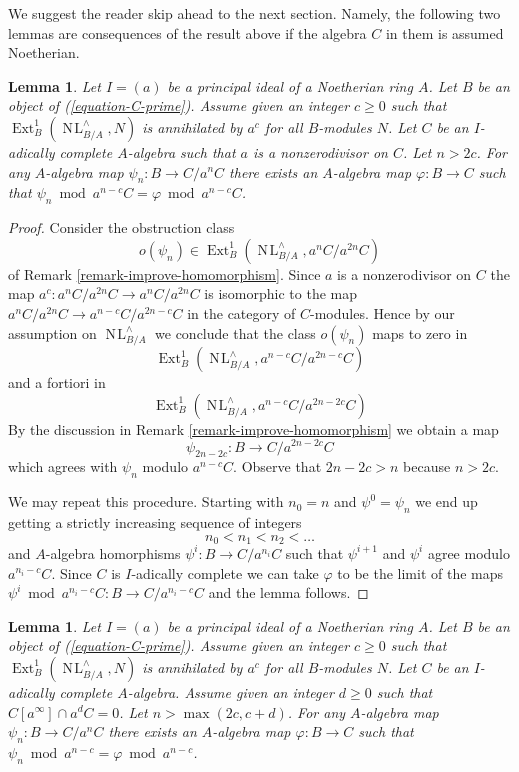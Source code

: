 \documentclass{stacks-project}
\theoremstyle{plain}
\newtheorem{lemma}[subsection]{Lemma}
\theoremstyle{definition}
\theoremstyle{remark}
\numberwithin{equation}{subsection}
\def\Ext{\mathop{\mathrm{Ext}}\nolimits}
\def\NL{\mathop{N\!L}\nolimits}
\begin{document}
\noindent
We suggest the reader skip ahead to the next section. Namely, the following
two lemmas are consequences of the result above if the algebra $C$ in them
is assumed Noetherian.

\begin{lemma}
\label{lemma-get-morphism-nonzerodivisor}
Let $I = (a)$ be a principal ideal of a Noetherian ring $A$.
Let $B$ be an object of (\ref{equation-C-prime}).
Assume given an integer $c \geq 0$ such that $\Ext^1_B(\NL_{B/A}^\wedge, N)$
is annihilated by $a^c$ for all $B$-modules $N$.
Let $C$ be an $I$-adically complete $A$-algebra such that
$a$ is a nonzerodivisor on $C$. Let $n > 2c$. For any $A$-algebra
map $\psi_n : B \to C/a^nC$ there exists an $A$-algebra
map $\varphi : B \to C$ such that
$\psi_n \bmod a^{n - c}C = \varphi \bmod a^{n - c}C$.
\end{lemma}

\begin{proof}
Consider the obstruction class
$$
o(\psi_n) \in \Ext^1_B(\NL_{B/A}^\wedge, a^nC/a^{2n}C)
$$
of Remark \ref{remark-improve-homomorphism}. Since $a$ is a nonzerodivisor
on $C$ the map $a^c : a^nC/a^{2n}C \to a^nC/a^{2n}C$ is isomorphic to the
map $a^nC/a^{2n}C \to a^{n - c}C/a^{2n - c}C$ in the category of $C$-modules.
Hence by our assumption on $\NL_{B/A}^\wedge$
we conclude that the class $o(\psi_n)$ maps to zero in
$$
\Ext^1_B(\NL_{B/A}^\wedge, a^{n - c}C/a^{2n - c}C)
$$
and a fortiori in
$$
\Ext^1_B(\NL_{B/A}^\wedge, a^{n - c}C/a^{2n - 2c}C)
$$
By the discussion in Remark \ref{remark-improve-homomorphism} we obtain a map
$$
\psi_{2n - 2c} : B \to C/a^{2n - 2c}C
$$
which agrees with $\psi_n$ modulo $a^{n - c}C$.
Observe that $2n - 2c > n$ because $n > 2c$.

\medskip\noindent
We may repeat this procedure. Starting with $n_0 = n$ and
$\psi^0 = \psi_n$ we end up getting a strictly increasing
sequence of integers
$$
n_0 < n_1 < n_2 < \ldots
$$
and $A$-algebra homorphisms $\psi^i : B \to C/a^{n_i}C$
such that $\psi^{i + 1}$ and $\psi^i$ agree modulo $a^{n_i - c}C$.
Since $C$ is $I$-adically complete we can take $\varphi$
to be the limit of the maps
$\psi^i \bmod a^{n_i - c}C : B \to C/a^{n_i - c}C$
and the lemma follows.
\end{proof}

\begin{lemma}
\label{lemma-get-morphism-principal}
Let $I = (a)$ be a principal ideal of a Noetherian ring $A$.
Let $B$ be an object of (\ref{equation-C-prime}).
Assume given an integer $c \geq 0$ such that $\Ext^1_B(\NL_{B/A}^\wedge, N)$
is annihilated by $a^c$ for all $B$-modules $N$.
Let $C$ be an $I$-adically complete $A$-algebra.
Assume given an integer $d \geq 0$ such that $C[a^\infty] \cap a^dC = 0$.
Let $n > \max(2c, c + d)$. For any $A$-algebra map
$\psi_n : B \to C/a^nC$ there exists an $A$-algebra map
$\varphi : B \to C$ such
that $\psi_n \bmod a^{n - c} = \varphi \bmod a^{n - c}$.
\end{lemma}
\end{document}
